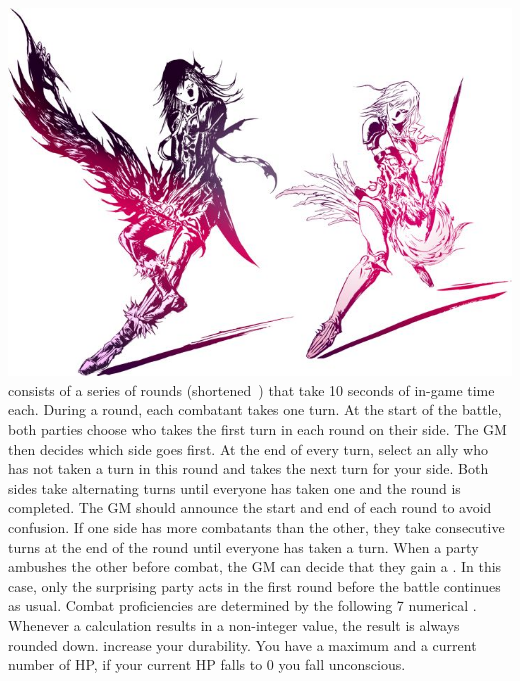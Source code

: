 %
\\
%
\includegraphics[width=\columnwidth]{./art/images/ff13-2.jpg}
%
\vfill
%
 consists of a series of rounds (shortened~) that take 10 seconds of in-game time each.
During a round, each combatant takes one turn.
At the start of the battle, both parties choose who takes the first turn in each round on their side.
The GM then decides which side goes first.
At the end of every turn, select an ally who has not taken a turn in this round and takes the next turn for your side.
Both sides take alternating turns until everyone has taken one and the round is completed.
The GM should announce the start and end of each round to avoid confusion.
If one side has more combatants than the other, they take consecutive turns at the end of the round until everyone has taken a turn.
When a party ambushes the other before combat, the GM can decide that they gain a .
In this case, only the surprising party acts in the first round before the battle continues as usual.
%
\vfill
%
Combat proficiencies are determined by the following 7 numerical .
Whenever a calculation results in a non-integer value, the result is always rounded down.
%
\ofgap
%
\newcommand{\attricon}[1]{\hspace*{0.15cm}}
%
\attricon{hp} increase your durability. You have a maximum and a current number of HP, if your current HP falls to 0 you fall unconscious. \ofrow
